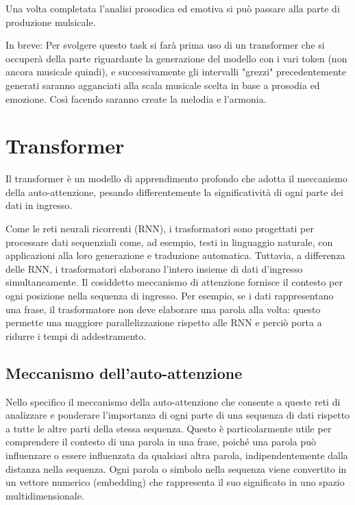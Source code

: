 Una volta completata l'analisi prosodica ed emotiva si può passare alla parte di produzione mulsicale.

In breve: Per svolgere questo task si farà prima uso di un transformer che si occuperà della parte riguardante la generazione del modello con i vari token (non ancora musicale quindi), e successivamente gli intervalli "grezzi" precedentemente generati saranno agganciati alla scala musicale scelta in base a prosodia ed emozione.
Così facendo saranno create la melodia e l'armonia.



\section{Transformer}
Il transformer è un modello di apprendimento profondo che adotta il meccanismo della auto-attenzione, pesando differentemente la significatività di ogni parte dei dati in ingresso. 

Come le reti neurali ricorrenti (RNN), i trasformatori sono progettati per processare dati sequenziali come, ad esempio, testi in linguaggio naturale, con applicazioni alla loro generazione e traduzione automatica. Tuttavia, a differenza delle RNN, i trasformatori elaborano l'intero insieme di dati d'ingresso simultaneamente. Il cosiddetto meccanismo di attenzione fornisce il contesto per ogni posizione nella sequenza di ingresso. Per esempio, se i dati rappresentano una frase, il trasformatore non deve elaborare una parola alla volta: questo permette una maggiore parallelizzazione rispetto alle RNN e perciò porta a ridurre i tempi di addestramento.


\subsection{Meccanismo dell'auto-attenzione}
Nello specifico il meccanismo della auto-attenzione che consente a queste reti di analizzare e ponderare l’importanza di ogni parte di una sequenza di dati rispetto a tutte le altre parti della stessa sequenza.
Questo è particolarmente utile per comprendere il contesto di una parola in una frase, poiché una parola può influenzare o essere influenzata da qualsiasi altra parola, indipendentemente dalla distanza nella sequenza. Ogni parola o simbolo nella sequenza viene convertito in un vettore numerico (embedding) che rappresenta il suo significato in uno spazio multidimensionale.

